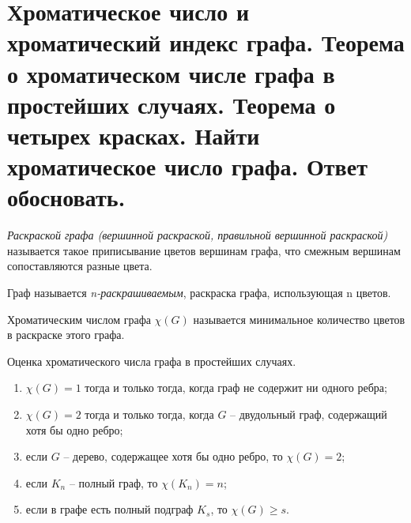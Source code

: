 \section{Хроматическое число и хроматический индекс графа. Теорема о хроматическом числе графа в 
простейших случаях. Теорема о четырех красках. Найти хроматическое число графа. Ответ 
обосновать.}

\begin{definition}
    \textit{Раскраской графа (вершинной раскраской, правильной
    вершинной раскраской)} называется такое приписывание цветов вершинам
    графа, что смежным вершинам сопоставляются разные цвета.
\end{definition}

\begin{definition}
    Граф называется \textit{n-раскрашиваемым},
    раскраска графа, использующая n цветов.
\end{definition}

\begin{definition}
    Хроматическим числом графа $\chi(G)$ называется минимальное
    количество цветов в раскраске этого графа.
\end{definition}

\begin{theorem}
    Оценка хроматического числа графа в простейших случаях.
    \begin{enumerate}[left=0.0em, labelsep=1em, topsep=0.0em, itemsep=0pt, parsep=0.5em]
        \item $\chi(G)=1$ тогда и только тогда, когда граф не содержит ни одного ребра;
        \item $\chi(G)=2$ тогда и только тогда, когда $G$ -- двудольный граф, содержащий хотя бы одно ребро;
        \item если $G$ -- дерево, содержащее хотя бы одно ребро, то $\chi(G)=2$;
        \item если $K_n$ -- полный граф, то $\chi(K_n)=n$;
        \item если в графе есть полный подграф $K_s$, то $\chi(G) \geq s$.
    \end{enumerate}
\end{theorem}

